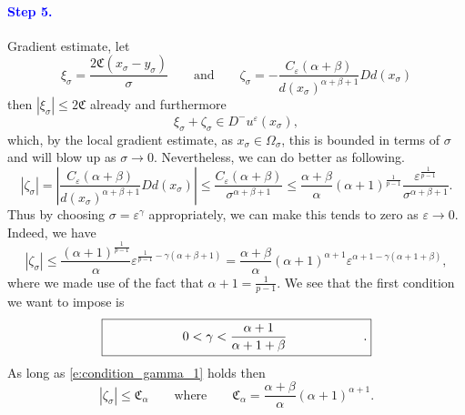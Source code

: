 \documentclass[11pt,reqno]{amsart}
\numberwithin{figure}{section}
\theoremstyle{plain}
\theoremstyle{remark}
\numberwithin{equation}{section}
\begin{document}
\paragraph{\textcolor{blue}{\textbf{Step 5.}}} Gradient estimate, let
\begin{equation*}
    \xi_\sigma = \frac{2\mathfrak{C}(x_\sigma-y_\sigma)}{\sigma} \qquad\text{and}\qquad \zeta_\sigma = - \frac{C_\varepsilon(\alpha+\beta)}{d(x_\sigma)^{\alpha+\beta+1}}D d(x_\sigma)
\end{equation*}
then $|\xi_\sigma|\leq 2\mathfrak{C}$ already and furthermore
\begin{equation*}
   \xi_\sigma+\zeta_\sigma \in D^-u^\varepsilon(x_\sigma),
\end{equation*}
which, by the local gradient estimate, as $x_\sigma\in \Omega_{\sigma}$, this is bounded in terms of $\sigma$ and will blow up as $\sigma\to 0$. Nevertheless, we can do better as following.
\begin{equation*}
 |\zeta_\sigma|=   \left|\frac{C_\varepsilon(\alpha+\beta)}{d(x_\sigma)^{\alpha+\beta+1}}D d(x_\sigma )\right| \leq \frac{C_\varepsilon(\alpha+\beta)}{\sigma^{\alpha+\beta+1}}\leq \frac{\alpha+\beta}{\alpha} (\alpha+1)^\frac{1}{p-1}\frac{\varepsilon^\frac{1}{p-1}}{\sigma^{\alpha+\beta+1}}.
\end{equation*}
Thus by choosing $\sigma = \varepsilon^\gamma$ appropriately, we can make this tends to zero as $\varepsilon \to 0$. Indeed, we have
\begin{equation*}
    |\zeta_\sigma| \leq \frac{(\alpha+1)^\frac{1}{p-1}}{\alpha} \varepsilon^{\frac{1}{p-1} - \gamma(\alpha+\beta+1)} = \frac{\alpha+\beta}{\alpha}(\alpha+1)^{\alpha+1}\varepsilon^{\alpha+1 - \gamma(\alpha+1+\beta)},
\end{equation*}
where we made use of the fact that $\alpha+1 = \frac{1}{p-1}$. We see that the first condition we want to impose is
\begin{equation}\label{e:condition_gamma_1}
    \fbox{\qquad\qquad\qquad$\displaystyle 0 < \gamma < \frac{\alpha+1}{\alpha+1+\beta}$\qquad\qquad\qquad.}
\end{equation}
As long as \eqref{e:condition_gamma_1} holds then
\begin{equation}\label{e:bddp_sigmaq_sigma}
    |\zeta_\sigma|\leq \mathfrak{C}_\alpha \qquad\text{where}\qquad \mathfrak{C}_\alpha = \frac{\alpha+\beta}{\alpha}(\alpha+1)^{\alpha+1}.
\end{equation}
\end{document}
